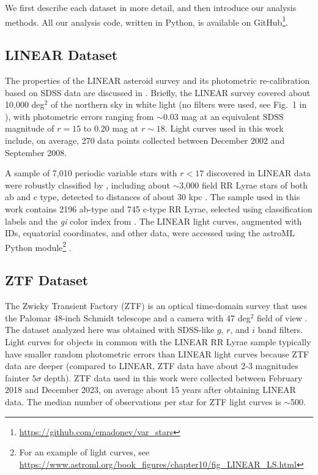 We first describe each dataset in more detail, and then introduce our analysis methods. All our analysis
code, written in Python, is available on GitHub\footnote{\url{https://github.com/emadonev/var_stars}}.  
 
\subsection{LINEAR Dataset}

The properties of the LINEAR asteroid survey and its photometric re-calibration based on SDSS data are discussed
in \cite{2011AJ....142..190S}. Briefly, the LINEAR survey covered about 10,000 deg$^2$ of the northern sky in white
light (no filters were used, see Fig.~1 in \citealt{2011AJ....142..190S}), with photometric errors ranging from $\sim$0.03
mag at an equivalent SDSS magnitude of $r=15$ to 0.20 mag at $r\sim18$. Light curves used in this work include,
on average, 270 data points collected between December 2002 and September 2008.
 
A sample of 7,010 periodic variable stars with $r<17$ discovered in LINEAR data were robustly classified by
\cite{2013AJ....146..101P}, including
about $\sim$3,000 field RR Lyrae stars of both ab and c type, detected to distances of about 30 kpc \citep{2013AJ....146...21S}.
The sample used in this work contains 2196 ab-type and 745 c-type RR Lyrae, selected using classification labels and the {\it gi}
color index from \cite{2013AJ....146..101P}.
The LINEAR light curves, augmented with IDs, equatorial coordinates, and other data, were accessed using the astroML Python
module\footnote{For an example of light curves, see \url{https://www.astroml.org/book_figures/chapter10/fig_LINEAR_LS.html}}
\citep{2012cidu.conf...47V}. 


\subsection{ZTF Dataset}

The Zwicky Transient Factory (ZTF) is an optical time-domain survey that uses the Palomar 48-inch Schmidt telescope
and a camera with 47 deg$^2$ field of view \citep{2019PASP..131a8002B}. The dataset analyzed here was obtained with
SDSS-like $g$, $r$, and $i$ band filters. Light curves for objects in common with the LINEAR RR Lyrae sample typically
have smaller random photometric errors than LINEAR light curves because ZTF data are deeper (compared to LINEAR,
ZTF data have about 2-3 magnitudes fainter  $5\sigma$ depth). ZTF data used in this work were collected between
February 2018 and December 2023, on average about 15 years after obtaining LINEAR data. The median number of
 observations per star for ZTF light curves is $\sim$500. 

